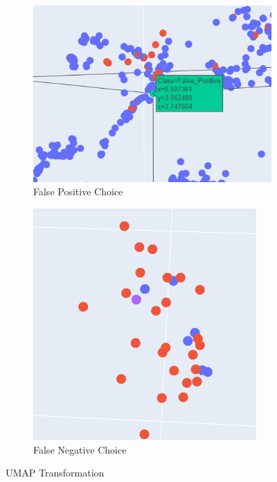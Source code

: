 \documentclass[12pt]{article}
\begin{document}
\begin{figure}
  \begin{subfigure}{.5\textwidth}
  \includegraphics[width=.95\textwidth]{../results/False_Positive_UMAP.png}
    \caption{False Positive Choice}
    \end{subfigure}%
  \begin{subfigure}{.5\textwidth}
    \includegraphics[width=.95\textwidth]{../results/False_Negative_UMAP.png}
    \caption{False Negative Choice}
  \end{subfigure}
  \caption{UMAP Transformation}
  \label{figure4}
\end{figure}
\end{document}
